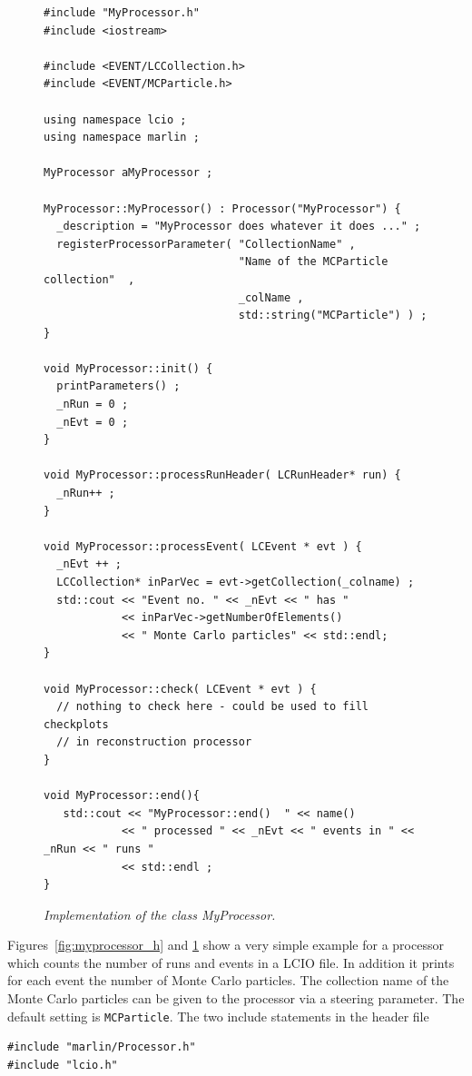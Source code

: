 \begin{figure}
\begin{verbatim}
#include "MyProcessor.h"
#include <iostream>

#include <EVENT/LCCollection.h>
#include <EVENT/MCParticle.h>

using namespace lcio ;
using namespace marlin ;

MyProcessor aMyProcessor ;

MyProcessor::MyProcessor() : Processor("MyProcessor") {
  _description = "MyProcessor does whatever it does ..." ;
  registerProcessorParameter( "CollectionName" , 
                              "Name of the MCParticle collection"  ,
                              _colName ,
                              std::string("MCParticle") ) ;
}

void MyProcessor::init() { 
  printParameters() ;
  _nRun = 0 ;
  _nEvt = 0 ;
}

void MyProcessor::processRunHeader( LCRunHeader* run) { 
  _nRun++ ;
} 

void MyProcessor::processEvent( LCEvent * evt ) { 
  _nEvt ++ ;
  LCCollection* inParVec = evt->getCollection(_colname) ;
  std::cout << "Event no. " << _nEvt << " has " 
            << inParVec->getNumberOfElements() 
            << " Monte Carlo particles" << std::endl;
}

void MyProcessor::check( LCEvent * evt ) { 
  // nothing to check here - could be used to fill checkplots 
  // in reconstruction processor
}

void MyProcessor::end(){ 
   std::cout << "MyProcessor::end()  " << name() 
            << " processed " << _nEvt << " events in " << _nRun << " runs "
            << std::endl ;
}
\end{verbatim}
\caption{\label{fig:myprocessor_cc}
\em Implementation of the class {\em MyProcessor}.
}
\end{figure}

Figures~\ref{fig:myprocessor_h} and \ref{fig:myprocessor_cc}
show a very simple example for a processor which counts the number of runs and
events in a LCIO file. In addition it prints for each event the number of 
Monte Carlo particles. The collection name of the Monte Carlo particles 
can be given to the processor via a steering parameter. The default setting is
{\tt MCParticle}. The two include statements in the header file

\begin{verbatim}
#include "marlin/Processor.h"
#include "lcio.h"
\end{verbatim}

